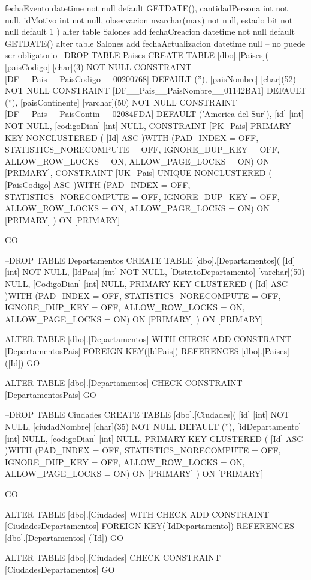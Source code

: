  fechaEvento datetime not null default GETDATE(),
  cantidadPersona int not null,
  idMotivo int not null,
  observacion nvarchar(max)  not null,
  estado bit not null default 1
)
alter table Salones add fechaCreacion datetime not null default GETDATE() 
alter table Salones add fechaActualizacion datetime null -- no puede ser obligatorio
--DROP TABLE Paises
CREATE TABLE [dbo].[Paises](
	[paisCodigo] [char](3) NOT NULL CONSTRAINT [DF__Pais__PaisCodigo__00200768]  DEFAULT (''),
	[paisNombre] [char](52) NOT NULL CONSTRAINT [DF__Pais__PaisNombre__01142BA1]  DEFAULT (''),
	[paisContinente] [varchar](50) NOT NULL CONSTRAINT [DF__Pais__PaisContin__02084FDA]  DEFAULT ('America del Sur'),
	[id] [int] NOT NULL,
	[codigoDian] [int] NULL,
 CONSTRAINT [PK_Pais] PRIMARY KEY NONCLUSTERED 
(
	[Id] ASC
)WITH (PAD_INDEX = OFF, STATISTICS_NORECOMPUTE = OFF, IGNORE_DUP_KEY = OFF, ALLOW_ROW_LOCKS = ON, ALLOW_PAGE_LOCKS = ON) ON [PRIMARY],
 CONSTRAINT [UK_Pais] UNIQUE NONCLUSTERED 
(
	[PaisCodigo] ASC
)WITH (PAD_INDEX = OFF, STATISTICS_NORECOMPUTE = OFF, IGNORE_DUP_KEY = OFF, ALLOW_ROW_LOCKS = ON, ALLOW_PAGE_LOCKS = ON) ON [PRIMARY]
) ON [PRIMARY]

GO

--DROP TABLE Departamentos
CREATE TABLE [dbo].[Departamentos](
	[Id] [int] NOT NULL,
	[IdPais] [int] NOT NULL,
	[DistritoDepartamento] [varchar](50) NULL,
	[CodigoDian] [int] NULL,
PRIMARY KEY CLUSTERED 
(
	[Id] ASC
)WITH (PAD_INDEX = OFF, STATISTICS_NORECOMPUTE = OFF, IGNORE_DUP_KEY = OFF, ALLOW_ROW_LOCKS = ON, ALLOW_PAGE_LOCKS = ON) ON [PRIMARY]
) ON [PRIMARY]


ALTER TABLE [dbo].[Departamentos]  WITH CHECK ADD  CONSTRAINT [DepartamentosPais] FOREIGN KEY([IdPais])
REFERENCES [dbo].[Paises] ([Id])
GO

ALTER TABLE [dbo].[Departamentos] CHECK CONSTRAINT [DepartamentosPais]
GO

--DROP TABLE Ciudades
CREATE TABLE [dbo].[Ciudades](
	[id] [int] NOT NULL,
	[ciudadNombre] [char](35) NOT NULL DEFAULT (''),
	[idDepartamento] [int] NULL,
	[codigoDian] [int] NULL,
PRIMARY KEY CLUSTERED 
(
	[Id] ASC
)WITH (PAD_INDEX = OFF, STATISTICS_NORECOMPUTE = OFF, IGNORE_DUP_KEY = OFF, ALLOW_ROW_LOCKS = ON, ALLOW_PAGE_LOCKS = ON) ON [PRIMARY]
) ON [PRIMARY]

GO

ALTER TABLE [dbo].[Ciudades]  WITH CHECK ADD  CONSTRAINT [CiudadesDepartamentos] FOREIGN KEY([IdDepartamento])
REFERENCES [dbo].[Departamentos] ([Id])
GO

ALTER TABLE [dbo].[Ciudades] CHECK CONSTRAINT [CiudadesDepartamentos]
GO

